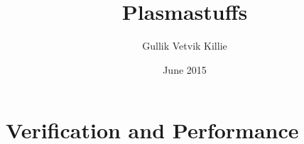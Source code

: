 \documentclass[x11names,twoside,english]{uiofysmaster}
\author{Gullik Vetvik Killie}
\title{Plasmastuffs}
\date{June 2015}
\begin{document}
% 
%
\tableofcontents
% 
%     

%     
%
%
\chapter{Verification and Performance}
    
    
    
    
    
    
\end{document}

